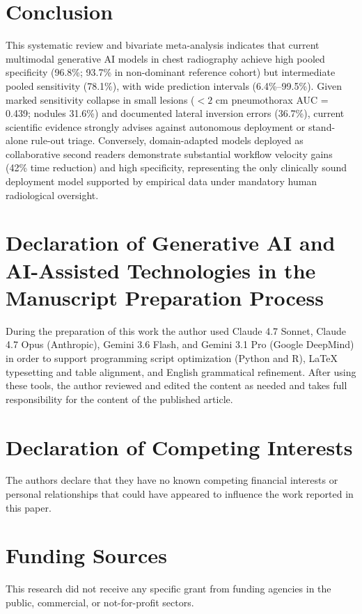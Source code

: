\documentclass[preprint,11pt]{elsarticle}
\begin{document}
\section{Conclusion}
This systematic review and bivariate meta-analysis indicates that current multimodal generative AI models in chest radiography achieve high pooled specificity (96.8\%; 93.7\% in non-dominant reference cohort) but intermediate pooled sensitivity (78.1\%), with wide prediction intervals (6.4\%--99.5\%). Given marked sensitivity collapse in small lesions ($<2$ cm pneumothorax AUC = 0.439; nodules 31.6\%) and documented lateral inversion errors (36.7\%), current scientific evidence strongly advises against autonomous deployment or stand-alone rule-out triage. Conversely, domain-adapted models deployed as collaborative second readers demonstrate substantial workflow velocity gains (42\% time reduction) and high specificity, representing the only clinically sound deployment model supported by empirical data under mandatory human radiological oversight.

\section*{Declaration of Generative AI and AI-Assisted Technologies in the Manuscript Preparation Process}
During the preparation of this work the author used Claude 4.7 Sonnet, Claude 4.7 Opus (Anthropic), Gemini 3.6 Flash, and Gemini 3.1 Pro (Google DeepMind) in order to support programming script optimization (Python and R), LaTeX typesetting and table alignment, and English grammatical refinement. After using these tools, the author reviewed and edited the content as needed and takes full responsibility for the content of the published article.

\section*{Declaration of Competing Interests}
The authors declare that they have no known competing financial interests or personal relationships that could have appeared to influence the work reported in this paper.

\section*{Funding Sources}
This research did not receive any specific grant from funding agencies in the public, commercial, or not-for-profit sectors.
\end{document}
